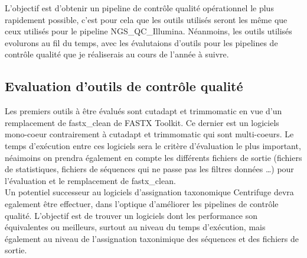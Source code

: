 L'objectif est d'obtenir un pipeline de contrôle qualité opérationnel le plus rapidement possible, c'est pour cela que les outils utilisés seront les même que ceux utilisés pour le pipeline NGS\_QC\_Illumina. Néanmoins, les outils utilisés evolurons au fil du temps, avec les évalutaions d'outils pour les pipelines de contrôle qualité que je réaliserais au cours de l'année à suivre.

\subsection{Evaluation d'outils de contrôle qualité}
Les premiers outils à être évalués sont cutadapt et trimmomatic en vue d'un remplacement de fastx\_clean de FASTX Toolkit. Ce dernier est un logiciels mono-coeur contrairement à cutadapt et trimmomatic qui sont multi-coeurs. Le temps d'exécution entre ces logiciels sera le critère d'évaluation le plus important, néaimoins on prendra également en compte les différents fichiers de sortie (fichiers de statistiques, fichiers de séquences qui ne passe pas les filtres données \dots) pour l'évaluation et le remplacement de fastx\_clean.\\

Un potentiel successeur au logiciels d'assignation taxonomique Centrifuge devra egalement être effectuer, dans l'optique d'améliorer les pipelines de contrôle qualité. L'objectif est de trouver un logiciels dont les performance son équivalentes ou meilleurs, surtout au niveau du temps d'exécution, mais également au niveau de l'assignation taxonimique des séquences et des fichiers de sortie.